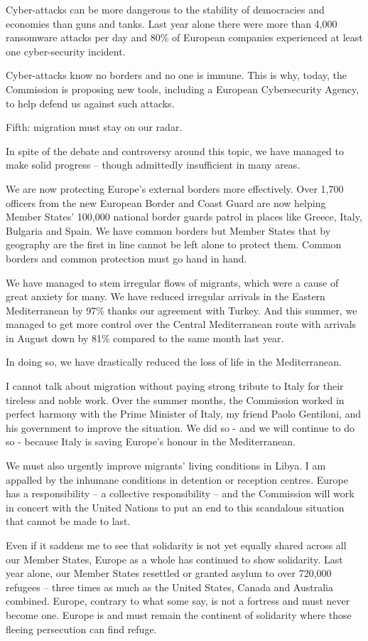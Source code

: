 \documentclass[a4paper,11pt]{article}
\begin{document}
Cyber-attacks can be more dangerous to the stability of democracies and economies than guns and tanks. Last year alone there were more than 4,000 ransomware attacks per day and 80\% of European companies experienced at least one cyber-security incident.

Cyber-attacks know no borders and no one is immune. This is why, today, the Commission is proposing new tools, including a European Cybersecurity Agency, to help defend us against such attacks.

Fifth: migration must stay on our radar.

In spite of the debate and controversy around this topic, we have managed to make solid progress – though admittedly insufficient in many areas.

We are now protecting Europe's external borders more effectively. Over 1,700 officers from the new European Border and Coast Guard are now helping Member States' 100,000 national border guards patrol in places like Greece, Italy, Bulgaria and Spain. We have common borders but Member States that by geography are the first in line cannot be left alone to protect them. Common borders and common protection must go hand in hand.

We have managed to stem irregular flows of migrants, which were a cause of great anxiety for many. We have reduced irregular arrivals in the Eastern Mediterranean by 97\% thanks our agreement with Turkey. And this summer, we managed to get more control over the Central Mediterranean route with arrivals in August down by 81\% compared to the same month last year.

In doing so, we have drastically reduced the loss of life in the Mediterranean.

I cannot talk about migration without paying strong tribute to Italy for their tireless and noble work. Over the summer months, the Commission worked in perfect harmony with the Prime Minister of Italy, my friend Paolo Gentiloni, and his government to improve the situation. We did so - and we will continue to do so - because Italy is saving Europe's honour in the Mediterranean.

We must also urgently improve migrants' living conditions in Libya. I am appalled by the inhumane conditions in detention or reception centres. Europe has a responsibility – a collective responsibility – and the Commission will work in concert with the United Nations to put an end to this scandalous situation that cannot be made to last.

Even if it saddens me to see that solidarity is not yet equally shared across all our Member States, Europe as a whole has continued to show solidarity. Last year alone, our Member States resettled or granted asylum to over 720,000 refugees – three times as much as the United States, Canada and Australia combined. Europe, contrary to what some say, is not a fortress and must never become one. Europe is and must remain the continent of solidarity where those fleeing persecution can find refuge.
\end{document}

